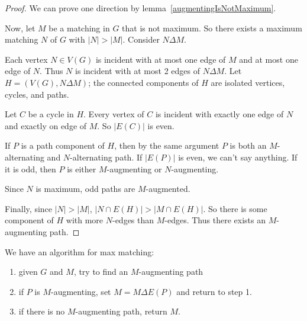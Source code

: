 \documentclass[12pt]{article}
\begin{document}
\begin{proof}
We can prove one direction by lemma~\ref{augmentingIsNotMaximum}.

Now, let $M$ be a matching in $G$ that is not maximum. So there exists a maximum matching $N$ of $G$ with $|N| > |M|$. Consider $N \Delta M$.

Each vertex $N \in V(G)$ is incident with at most one edge of $M$ and at most one edge of $N$. Thus $N$ is incident with at most 2 edges of $N \Delta M$. Let $H = (V(G), N \Delta M)$; the connected components of $H$ are isolated vertices, cycles, and paths.

Let $C$ be a cycle in $H$. Every vertex of $C$ is incident with exactly one edge of $N$ and exactly on edge of $M$. So $|E(C)|$ is even.

If $P$ is a path component of $H$, then by the same argument $P$ is both an $M$-alternating and $N$-alternating path. If $|E(P)|$ is even, we can't say anything. If it is odd, then $P$ is either $M$-augmenting or $N$-augmenting.

Since $N$ is maximum, odd paths are $M$-augmented.

Finally, since $|N| > |M|$, $|N \cap E(H)| > |M \cap E(H)|$. So there is some component of $H$ with more $N$-edges than $M$-edges. Thus there exists an $M$-augmenting path.
\end{proof}

We have an algorithm for max matching:
\begin{enumerate}
\item given $G$ and $M$, try to find an $M$-augmenting path
\item if $P$ is $M$-augmenting, set $M = M \Delta E(P)$ and return to step 1.
\item if there is no $M$-augmenting path, return $M$.
\end{enumerate}
\end{document}
